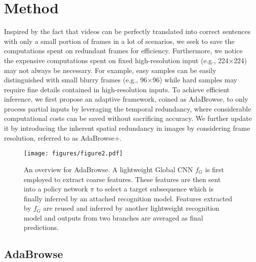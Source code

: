 \documentclass[sigconf]{acmart}
\begin{document}
\section{Method}
Inspired by the fact that videos can be perfectly translated into correct sentences with only a small portion of frames in a lot of scenarios, we seek to save the computations spent on redundant frames for efficiency. Furthermore, we notice the expensive computations spent on fixed high-resolution input (e.g., 224$\times$224) may not always be necessary. For example, easy samples can be easily distinguished with small blurry frames (e.g., 96$\times$96) while hard samples may require fine details contained in high-resolution inputs. To achieve efficient inference, we first propose an adaptive framework, coined as AdaBrowse, to only process partial inputs by leveraging the temporal redundancy, where considerable computational costs can be saved without sacrificing accuracy. We further update it by introducing the inherent spatial redundancy in images by considering frame resolution, referred to as AdaBrowse+.   
  


  \begin{figure*}[t]
    \centering
    \texttt{[image: figures/figure2.pdf]} 
    \caption{An overview for AdaBrowse. A lightweight Global CNN $f_G$ is first employed to extract coarse features. These features are then sent into a policy network $\pi$ to select a target subsequence which is finally inferred by an attached recognition model. Features extracted by $f_G$ are reused and inferred by another lightweight recognition model and outputs from two branches are averaged as final predictions.}
    \label{fig2}
  \end{figure*}
    
\subsection{AdaBrowse}
\end{document}
